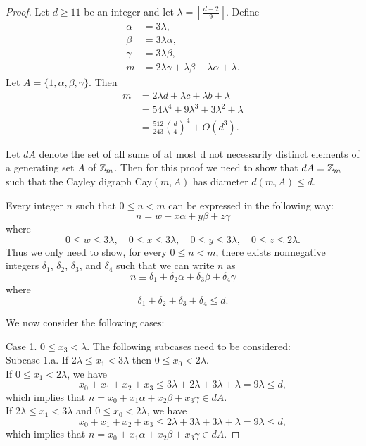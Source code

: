 \begin{proof}
Let $d \geq 11$ be an integer and let $\lambda = \left \lfloor \frac{d - 2}{9} \right \rfloor$. Define
\begin{align*}
\alpha &= 3 \lambda,\\
\beta &=3 \lambda \alpha,\\
\gamma &= 3 \lambda \beta,\\
m &= 2 \lambda \gamma + \lambda \beta + \lambda \alpha + \lambda.
\end{align*}
Let $A = \{1, \alpha, \beta, \gamma\}$. Then
\begin{align*}
m &= 2 \lambda d + \lambda c + \lambda b + \lambda \\
&= 54\lambda^4 + 9\lambda^3 + 3\lambda^2 + \lambda\\
&= \frac{512}{243}\left(\frac d4\right)^4 + O(d^3).
\end{align*}

Let $dA$ denote the set of all sums of at most d not necessarily distinct elements of a generating set $A$ of $\mbox{$\mathbb Z$}_m$. Then for this proof we need to show that $dA = \mbox{$\mathbb Z$}_m$ such that the Cayley digraph Cay$(m, A)$ has diameter $d(m, A) \leq d$. 

Every integer $n$ such that $0 \leq n < m$ can be expressed in the following way:
\[ n = w + x\alpha + y\beta + z\gamma\]
where 
\[ 0 \leq w \leq 3\lambda, \quad 0 \leq x \leq 3\lambda,\quad 0 \leq y \leq 3\lambda,\quad 0 \leq z \leq 2\lambda.\]
Thus we only need to show, for every $0 \leq n < m$, there exists nonnegative integers $\delta_1$, $\delta_2$, $\delta_3$, and $\delta_4$ such that we can write $n$ as
\[ n \equiv \delta_1 + \delta_2 \alpha + \delta_3 \beta + \delta_4 \gamma\]
where 
\[ \delta_1 + \delta_2 + \delta_3 + \delta_4 \leq d.\]

We now consider the following cases:

Case 1.  $0 \leq x_3 < \lambda$. The following subcases need to be considered:\\
Subcase 1.a. If $2 \lambda \leq x_1 < 3 \lambda$ then $0 \leq x_0 < 2\lambda$. \\
If $0 \leq x_1 < 2 \lambda$, we have 
\[ x_0 + x_1 + x_2 + x_3 \leq 3\lambda + 2\lambda + 3\lambda + \lambda = 9\lambda \leq d, \]
which implies that $n = x_0 + x_1\alpha + x_2\beta + x_3\gamma \in dA$. \\
If $2 \lambda \leq x_1 < 3 \lambda$ and  $0 \leq x_0 < 2\lambda$, we have 
\[ x_0 + x_1 + x_2 + x_3 \leq 2\lambda + 3\lambda + 3\lambda + \lambda = 9\lambda \leq d, \]
which implies that $n = x_0 + x_1\alpha + x_2\beta + x_3\gamma \in dA$. 


\end{proof}
